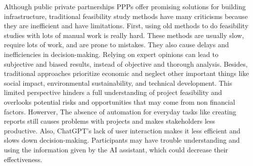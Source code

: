 Although public private partnerships PPPs offer promising solutions for building infrastructure, traditional feasibility study methods have many criticisms because they are inefficient and have limitations.
\vskip 0.5cm
First, using old methods to do feasibility studies with lots of manual work is really hard. These methods are usually slow, require lots of work, and are prone to mistakes. They also cause delays and inefficiencies in decision-making. Relying on expert opinions can lead to subjective and biased results, instead of objective and thorough analysis.
\vskip 0.5cm
Besides, traditional approaches prioritize economic and neglect other important things like social impact, environmental sustainability, and technical development. This limited perspective hinders a full understanding of project feasibility and overlooks potential risks and opportunities that may come from non financial factors.
\vskip 0.5cm
Howerver, The absence of automation for everyday tasks like creating reports still causes problems with projects and makes stakeholders less productive.
\vskip 0.5cm
Also, ChatGPT's lack of user interaction makes it less efficient and slows down decision-making. Participants may have trouble understanding and using the information given by the AI assistant, which could decrease their effectiveness.
